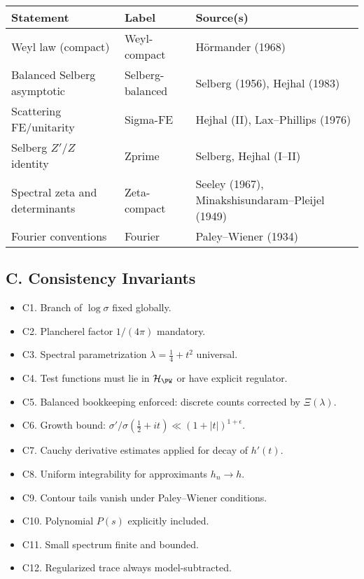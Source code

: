 \begin{center}
\renewcommand{\arraystretch}{1.15}
\begin{tabular}{lll}
\toprule
\textbf{Statement} & \textbf{Label} & \textbf{Source(s)} \\
\midrule
Weyl law (compact) & Weyl-compact & Hörmander (1968) \\
Balanced Selberg asymptotic & Selberg-balanced & Selberg (1956), Hejhal (1983) \\
Scattering FE/unitarity & Sigma-FE & Hejhal (II), Lax–Phillips (1976) \\
Selberg $Z'/Z$ identity & Zprime & Selberg, Hejhal (I–II) \\
Spectral zeta and determinants & Zeta-compact & Seeley (1967), Minakshisundaram–Pleijel (1949) \\
Fourier conventions & Fourier & Paley–Wiener (1934) \\
\bottomrule
\end{tabular}
\end{center}

\subsection*{C. Consistency Invariants}
\label{subsec:invariants}

\begin{itemize}
  \item C1. Branch of $\log\sigma$ fixed globally.
  \item C2. Plancherel factor $1/(4\pi)$ mandatory.
  \item C3. Spectral parametrization $\lambda=\tfrac14+t^2$ universal.
  \item C4. Test functions must lie in $\mathcal H_{\PW}$ or have explicit regulator.
  \item C5. Balanced bookkeeping enforced: discrete counts corrected by $\Xi(\lambda)$.
  \item C6. Growth bound: $\sigma'/\sigma(\tfrac12+it)\ll (1+|t|)^{1+\epsilon}$.
  \item C7. Cauchy derivative estimates applied for decay of $h'(t)$.
  \item C8. Uniform integrability for approximants $h_n\to h$.
  \item C9. Contour tails vanish under Paley–Wiener conditions.
  \item C10. Polynomial $P(s)$ explicitly included.
  \item C11. Small spectrum finite and bounded.
  \item C12. Regularized trace always model-subtracted.
\end{itemize}

